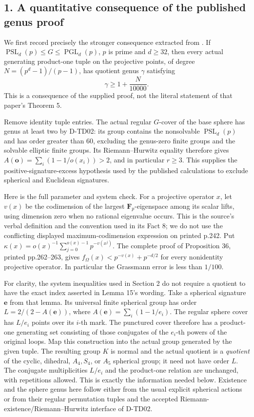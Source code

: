 \subsection*{1. A quantitative consequence of the published genus proof}

We first record precisely the stronger consequence extracted from
\cite{PFL:FGM2014}. If
\(\operatorname{PSL}_d(p)\le G\le\operatorname{PGL}_d(p)\),
\(p\) is prime and \(d\ge32\), then every actual generating
product-one tuple on the projective points, of degree
\(N=(p^d-1)/(p-1)\), has quotient genus \(\gamma\) satisfying
\[
                         \gamma\ge1+\frac{N}{10000}.
 \tag{PFL.3}
\]
This is a consequence of the supplied proof, not the literal
statement of that paper's Theorem 5.

Remove identity tuple entries. The actual regular \(G\)-cover of
the base sphere has genus at least two by D-TD02: its group contains
the nonsolvable \(\operatorname{PSL}_d(p)\) and has order greater
than 60, excluding the genus-zero finite groups and the solvable
elliptic finite groups. Its Riemann--Hurwitz equality therefore gives
\(A(\mathbf o)=\sum_i(1-1/o(x_i))>2\), and in particular \(r\ge3\).
This supplies the positive-signature-excess hypothesis used by the
published calculations to exclude spherical and Euclidean signatures.

Here is the full parameter and system check. For a projective
operator \(x\), let \(v(x)\) be the codimension of the largest
\(\mathbf F_p\)-eigenspace among its scalar lifts, using dimension
zero when no rational eigenvalue occurs. This is the source's
verbal definition and the convention used in its Fact 8;
we do not use the conflicting displayed maximum-codimension
expression on printed p.242. Put
\(\kappa(x)=o(x)^{-1}\sum_{j=0}^{o(x)-1}p^{-v(x^j)}\).
The complete proof of Proposition 36, printed pp.262--263, gives
\(f_\Omega(x)<p^{-v(x)}+p^{-d/2}\) for every nonidentity
projective operator. In particular the Grassmann error is less
than \(1/100\).

For clarity, the system inequalities used in Section 2 do not
require a quotient to have the exact index asserted in Lemma 15's
wording. Take a spherical signature \(\mathbf e\) from that lemma.
Its universal finite spherical group has order
\(L=2/(2-A(\mathbf e))\), where
\(A(\mathbf e)=\sum_i(1-1/e_i)\).
The regular sphere cover has \(L/e_i\)
points over its \(i\)-th mark. The punctured cover therefore has a
product-one generating set consisting of those conjugates of the
\(e_i\)-th powers of the original loops. Map this construction into
the actual group generated by the given tuple. The resulting group
\(K\) is normal and the actual quotient is a \emph{quotient} of the
cyclic, dihedral, \(A_4,S_4\), or \(A_5\) spherical group; it need
not have order \(L\). The conjugate multiplicities \(L/e_i\) and
the product-one relation are unchanged, with repetitions allowed.
This is exactly the information needed below. Existence and the
sphere genus here follow either from the usual explicit spherical
actions or from their regular permutation tuples and the accepted
Riemann-existence/Riemann--Hurwitz interface of D-TD02.

